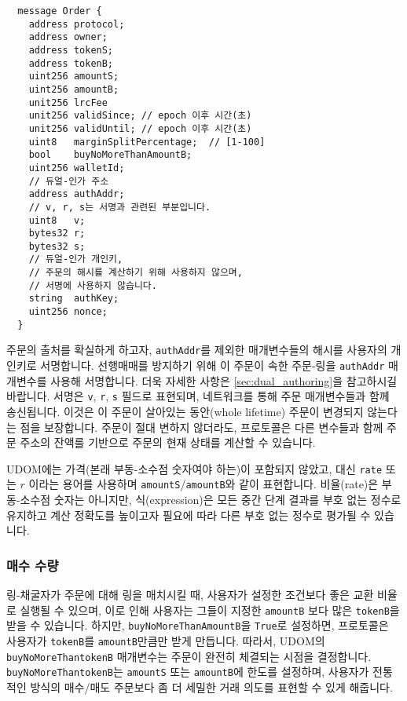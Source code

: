 \documentclass[UTF8,nofonts]{article}
\begin{document}
\begin{multicols}{2}
\begin{verbatim}
  message Order {
    address protocol;
    address owner;
    address tokenS;
    address tokenB;
    uint256 amountS;
    uint256 amountB;
    unit256 lrcFee
    unit256 validSince; // epoch 이후 시간(초)
    unit256 validUntil; // epoch 이후 시간(초)
    uint8   marginSplitPercentage;  // [1-100]
    bool    buyNoMoreThanAmountB;
    uint256 walletId;
    // 듀얼-인가 주소
    address authAddr;
   	// v, r, s는 서명과 관련된 부분입니다.
    uint8   v;       
    bytes32 r;
    bytes32 s;
    // 듀얼-인가 개인키,
    // 주문의 해시를 계산하기 위해 사용하지 않으며,
    // 서명에 사용하지 않습니다.
    string  authKey;          
    uint256 nonce;
  }
\end{verbatim}

주문의 출처를 확실하게 하고자, \verb|authAddr|를 제외한 매개변수들의 해시를 사용자의 개인키로 서명합니다. 선행매매를 방지하기 위해 이 주문이 속한 주문-링을 \verb|authAddr| 매개변수를 사용해 서명합니다. 더욱 자세한 사항은 \ref{sec:dual_authoring}을 참고하시길 바랍니다. 서명은 \verb|v|, \verb|r|, \verb|s| 필드로 표현되며, 네트워크를 통해 주문 매개변수들과 함께 송신됩니다. 이것은 이 주문이 살아있는 동안(whole lifetime) 주문이 변경되지 않는다는 점을 보장합니다. 주문이 절대 변하지 않더라도, 프로토콜은 다른 변수들과 함께 주문 주소의 잔액를 기반으로 주문의 현재 상태를 계산할 수 있습니다. 

UDOM에는 가격(본래 부동-소수점 숫자여야 하는)이 포함되지 않았고, 대신 \verb|rate| 또는 $r$ 이라는 용어를 사용하며 \verb|amountS|/\verb|amountB|와 같이 표현합니다. 비율(rate)은 부동-소수점 숫자는 아니지만, 식(expression)은 모든 중간 단계 결과를 부호 없는 정수로 유지하고 계산 정확도를 높이고자 필요에 따라 다른 부호 없는 정수로 평가될 수 있습니다.    
 
\subsubsection{매수 수량}

링-채굴자가 주문에 대해 링을 매치시킬 때, 사용자가 설정한 조건보다 좋은 교환 비율로 실행될 수 있으며, 이로 인해 사용자는 그들이 지정한 \verb|amountB| 보다 많은 \verb|tokenB|을 받을 수 있습니다. 하지만, \verb|buyNoMoreThanAmountB|을 \verb|True|로 설정하면, 프로토콜은 사용자가 \verb|tokenB|를 \verb|amountB|만큼만 받게 만듭니다. 따라서, UDOM의 \verb|buyNoMoreThantokenB| 매개변수는 주문이 완전히 체결되는 시점을 결정합니다. \verb|buyNoMoreThantokenB|는 \verb|amountS| 또는 \verb|amountB|에 한도를 설정하며, 사용자가 전통적인 방식의 매수/매도 주문보다 좀 더 세밀한 거래 의도를 표현할 수 있게 해줍니다.    


\end{multicols}
\end{document}
